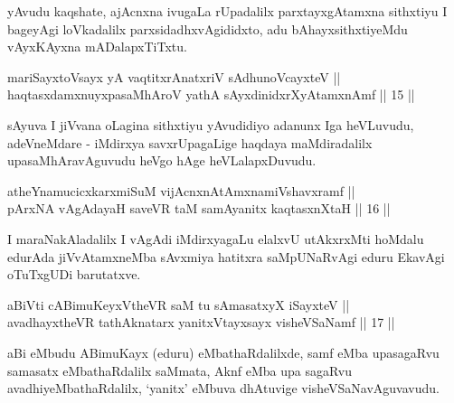 \begin{artha}
yAvudu kaqshate, ajAcnxna ivugaLa rUpadalilx parxtayxgAtamxna
sithxtiyu I bageyAgi loVkadalilx parxsidadhxvAgididxto, adu
bAhayxsithxtiyeMdu vAyxKAyxna mADalapxTiTxtu.
\end{artha}


\begin{shl}
mariSayxtoV\s sayx yA vaqtitxrAnatxriV sA\s dhunoVcayxteV ||  \\
haqtasxdamxnuyxpasaMhAroV yathA sAyxdinidxrXyAtamxnAmf \hfill || 15 ||
  
\end{shl}

\begin{artha}
sAyuva I jiVvana oLagina sithxtiyu yAvudidiyo adanunx Iga heVLuvudu,
adeVneMdare - iMdirxya savxrUpagaLige haqdaya maMdiradalilx
upasaMhAravAguvudu heVgo hAge heVLalapxDuvudu.
\end{artha}


\begin{shl}
atheYnamucicxkarxmiSuM vijAcnxnAtAmxnamiVshavxramf || \\
pArxNA vAgAdayaH saveVR taM samAyanitx kaqtasxnXtaH \hfill || 16 ||
  
\end{shl}

\begin{artha}
I maraNakAladalilx I vAgAdi iMdirxyagaLu elalxvU utAkxrxMti hoMdalu
edurAda jiVvAtamxneMba sAvxmiya hatitxra saMpUNaRvAgi eduru EkavAgi
oTuTxgUDi barutatxve.
\end{artha}


\begin{shl}
aBiVti cA\s \s BimuKeyxV\s theVR saM tu sAmasatxyX iSayxteV ||  \\
avadhayxtheVR tathA\s \s knatarx yanitxVtayxsayx visheVSaNamf \hfill || 17 ||
 
\end{shl}

\begin{artha}
aBi eMbudu ABimuKayx (eduru) eMbathaRdalilxde, samf eMba upasagaRvu
samasatx eMbathaRdalilx saMmata, Aknf eMba upa sagaRvu
avadhiyeMbathaRdalilx, `yanitx' eMbuva dhAtuvige visheVSaNavAguvavudu.
\end{artha}

